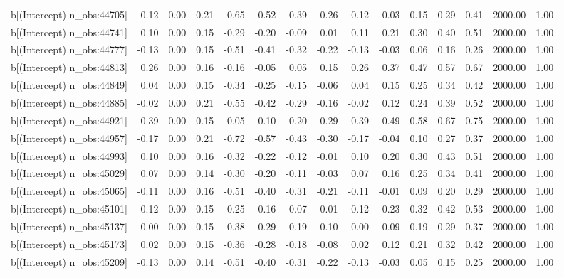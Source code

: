 \begin{table}[ht]
\begin{tabular}{rrrrrrrrrrrrrrr}
  b[(Intercept) n\_obs:44705] & -0.12 & 0.00 & 0.21 & -0.65 & -0.52 & -0.39 & -0.26 & -0.12 & 0.03 & 0.15 & 0.29 & 0.41 & 2000.00 & 1.00 \\ 
  b[(Intercept) n\_obs:44741] & 0.10 & 0.00 & 0.15 & -0.29 & -0.20 & -0.09 & 0.01 & 0.11 & 0.21 & 0.30 & 0.40 & 0.51 & 2000.00 & 1.00 \\ 
  b[(Intercept) n\_obs:44777] & -0.13 & 0.00 & 0.15 & -0.51 & -0.41 & -0.32 & -0.22 & -0.13 & -0.03 & 0.06 & 0.16 & 0.26 & 2000.00 & 1.00 \\ 
  b[(Intercept) n\_obs:44813] & 0.26 & 0.00 & 0.16 & -0.16 & -0.05 & 0.05 & 0.15 & 0.26 & 0.37 & 0.47 & 0.57 & 0.67 & 2000.00 & 1.00 \\ 
  b[(Intercept) n\_obs:44849] & 0.04 & 0.00 & 0.15 & -0.34 & -0.25 & -0.15 & -0.06 & 0.04 & 0.15 & 0.25 & 0.34 & 0.42 & 2000.00 & 1.00 \\ 
  b[(Intercept) n\_obs:44885] & -0.02 & 0.00 & 0.21 & -0.55 & -0.42 & -0.29 & -0.16 & -0.02 & 0.12 & 0.24 & 0.39 & 0.52 & 2000.00 & 1.00 \\ 
  b[(Intercept) n\_obs:44921] & 0.39 & 0.00 & 0.15 & 0.05 & 0.10 & 0.20 & 0.29 & 0.39 & 0.49 & 0.58 & 0.67 & 0.75 & 2000.00 & 1.00 \\ 
  b[(Intercept) n\_obs:44957] & -0.17 & 0.00 & 0.21 & -0.72 & -0.57 & -0.43 & -0.30 & -0.17 & -0.04 & 0.10 & 0.27 & 0.37 & 2000.00 & 1.00 \\ 
  b[(Intercept) n\_obs:44993] & 0.10 & 0.00 & 0.16 & -0.32 & -0.22 & -0.12 & -0.01 & 0.10 & 0.20 & 0.30 & 0.43 & 0.51 & 2000.00 & 1.00 \\ 
  b[(Intercept) n\_obs:45029] & 0.07 & 0.00 & 0.14 & -0.30 & -0.20 & -0.11 & -0.03 & 0.07 & 0.16 & 0.25 & 0.34 & 0.41 & 2000.00 & 1.00 \\ 
  b[(Intercept) n\_obs:45065] & -0.11 & 0.00 & 0.16 & -0.51 & -0.40 & -0.31 & -0.21 & -0.11 & -0.01 & 0.09 & 0.20 & 0.29 & 2000.00 & 1.00 \\ 
  b[(Intercept) n\_obs:45101] & 0.12 & 0.00 & 0.15 & -0.25 & -0.16 & -0.07 & 0.01 & 0.12 & 0.23 & 0.32 & 0.42 & 0.53 & 2000.00 & 1.00 \\ 
  b[(Intercept) n\_obs:45137] & -0.00 & 0.00 & 0.15 & -0.38 & -0.29 & -0.19 & -0.10 & -0.00 & 0.09 & 0.19 & 0.29 & 0.37 & 2000.00 & 1.00 \\ 
  b[(Intercept) n\_obs:45173] & 0.02 & 0.00 & 0.15 & -0.36 & -0.28 & -0.18 & -0.08 & 0.02 & 0.12 & 0.21 & 0.32 & 0.42 & 2000.00 & 1.00 \\ 
  b[(Intercept) n\_obs:45209] & -0.13 & 0.00 & 0.14 & -0.51 & -0.40 & -0.31 & -0.22 & -0.13 & -0.03 & 0.05 & 0.15 & 0.25 & 2000.00 & 1.00 \\ 

\end{tabular}
\end{table}
